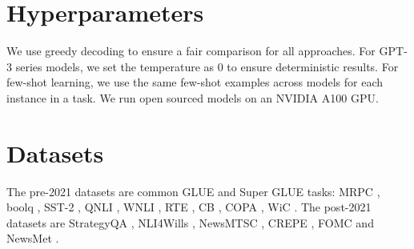 \documentclass[letterpaper]{article} %
\newcommand{\jmf}[1]{}      %
\begin{document}




\newpage

\appendix

\section{Hyperparameters}
\label{app:hyperparameters}
We use greedy decoding to ensure a fair comparison for all approaches. For GPT-3 series models, we set the temperature as 0 to ensure deterministic results. For few-shot learning, we use the same few-shot examples across models for each instance in a task. We run open sourced models on an NVIDIA A100 GPU.


\section{Datasets}
\label{app:datasets}
\jmf{update}The pre-2021 datasets are common GLUE \cite{wang2018} and Super GLUE \cite{Wang2019} tasks: MRPC \cite{dolan-brockett-2005}, boolq \cite{clark2019}, SST-2 \cite{socher2013}, QNLI \cite{Demszky2018}, WNLI \cite{levesque2012}, RTE \cite{Giampiccolo2008}, CB \cite{Marneffe2019}, COPA \cite{roemmele2011}, WiC \cite{pilehvar2019}. The post-2021 datasets are StrategyQA \cite{geva2021},  NLI4Wills \cite{kwak2022}, NewsMTSC \cite{hamborg2021}, CREPE \cite{yu2023}, FOMC \cite{shah2023} and NewsMet \cite{joseph2023}.
\end{document}
